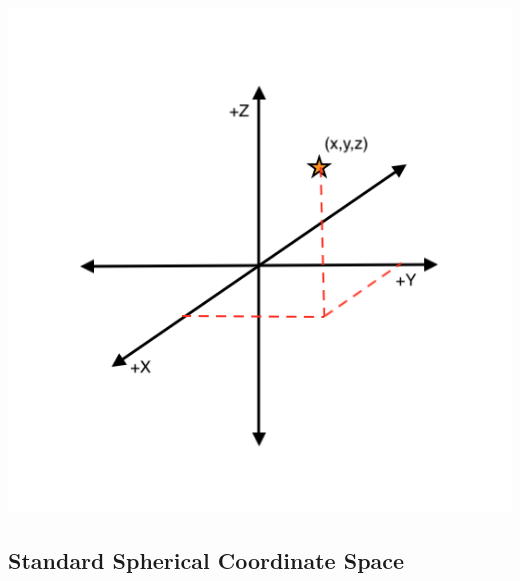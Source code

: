   \begin{minipage}{0.5\textwidth}
    \includegraphics{diagrams/CartesianSpace.png}
  \end{minipage}
  \vspace{-0.75cm}

  \subsection{Standard Spherical Coordinate Space}
  \label{sect:Spherical}

